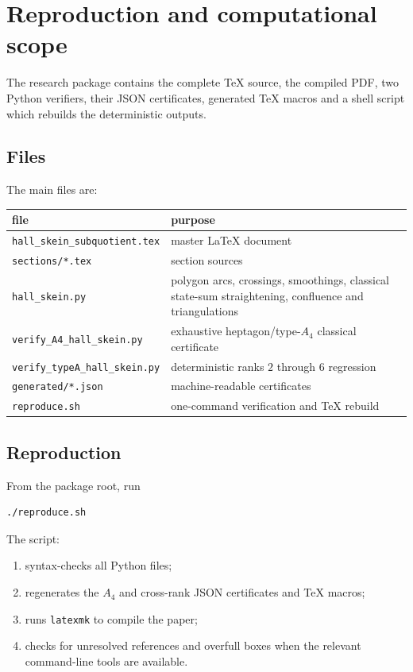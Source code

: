 \section{Reproduction and computational scope}
\label{sec:reproduction}

The research package contains the complete TeX source, the compiled PDF, two
Python verifiers, their JSON certificates, generated TeX macros and a shell
script which rebuilds the deterministic outputs.

\subsection{Files}

The main files are:
\begin{center}
\begin{tabular}{p{}p{}}
\toprule
file & purpose\\
\midrule
\texttt{hall\_skein\_subquotient.tex}
 & master LaTeX document\\
\texttt{sections/*.tex}
 & section sources\\
\texttt{hall\_skein.py}
 & polygon arcs, crossings, smoothings, classical state-sum straightening,
   confluence and triangulations\\
\texttt{verify\_A4\_hall\_skein.py}
 & exhaustive heptagon/type-$A_4$ classical certificate\\
\texttt{verify\_typeA\_hall\_skein.py}
 & deterministic ranks $2$ through $6$ regression\\
\texttt{generated/*.json}
 & machine-readable certificates\\
\texttt{reproduce.sh}
 & one-command verification and TeX rebuild\\
\bottomrule
\end{tabular}
\end{center}

\subsection{Reproduction}

From the package root, run
\begin{verbatim}
./reproduce.sh
\end{verbatim}
The script:
\begin{enumerate}[label=\arabic*.,leftmargin=2.3em]
\item syntax-checks all Python files;
\item regenerates the $A_4$ and cross-rank JSON certificates and TeX macros;
\item runs \texttt{latexmk} to compile the paper;
\item checks for unresolved references and overfull boxes when the relevant
      command-line tools are available.
\end{enumerate}

